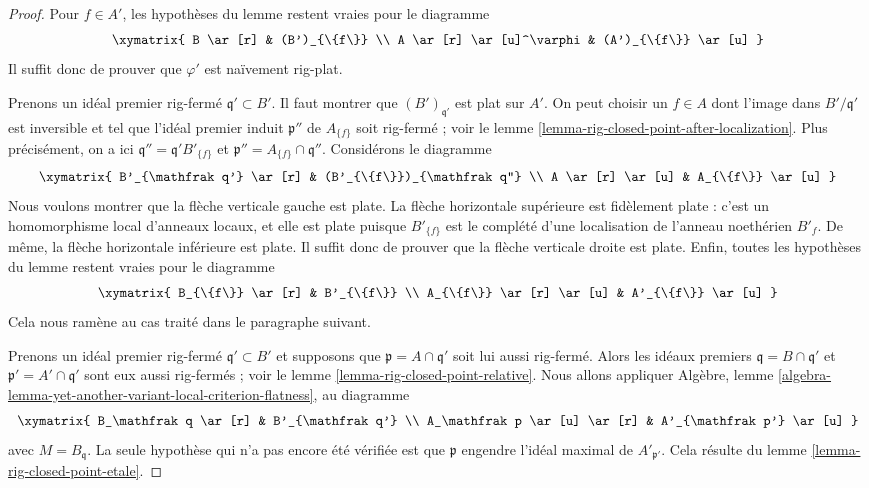 \begin{proof}
Pour $f \in A'$, les hypothèses du lemme restent vraies pour le diagramme
$$
\xymatrix{
B \ar[r] & (B')_{\{f\}} \\
A \ar[r] \ar[u]^\varphi & (A')_{\{f\}} \ar[u]
}
$$
Il suffit donc de prouver que $\varphi'$ est naïvement rig-plat.

\medskip\noindent
Prenons un idéal premier rig-fermé $\mathfrak q' \subset B'$.
Il faut montrer que $(B')_{\mathfrak q'}$ est plat sur $A'$.
On peut choisir un $f \in A$ dont l'image dans $B'/\mathfrak q'$ est inversible
et tel que l'idéal premier induit $\mathfrak p''$ de $A_{\{f\}}$ 
soit rig-fermé ; voir le lemme \ref{lemma-rig-closed-point-after-localization}.
Plus précisément, on a ici $\mathfrak q'' = \mathfrak q' B'_{\{f\}}$ et
$\mathfrak p'' = A_{\{f\}} \cap \mathfrak q''$.
Considérons le diagramme
$$
\xymatrix{
B'_{\mathfrak q'} \ar[r] &
(B'_{\{f\}})_{\mathfrak q''} \\
A \ar[r] \ar[u] &
A_{\{f\}} \ar[u]
}
$$
Nous voulons montrer que la flèche verticale gauche est plate.
La flèche horizontale supérieure est fidèlement plate : c'est un
homomorphisme local d'anneaux locaux, et elle est plate puisque $B'_{\{f\}}$
est le complété d'une localisation de l'anneau noethérien
$B'_f$. De même, la flèche horizontale inférieure est plate.
Il suffit donc de prouver que la flèche verticale droite est plate.
Enfin, toutes les hypothèses du lemme restent vraies pour le diagramme
$$
\xymatrix{
B_{\{f\}} \ar[r] &
B'_{\{f\}} \\
A_{\{f\}} \ar[r] \ar[u] &
A'_{\{f\}} \ar[u]
}
$$
Cela nous ramène au cas traité dans le paragraphe suivant.

\medskip\noindent
Prenons un idéal premier rig-fermé $\mathfrak q' \subset B'$
et supposons que $\mathfrak p = A \cap \mathfrak q'$ soit lui aussi rig-fermé.
Alors les idéaux premiers $\mathfrak q = B \cap \mathfrak q'$
et $\mathfrak p' = A' \cap \mathfrak q'$ sont eux aussi rig-fermés ; voir
le lemme \ref{lemma-rig-closed-point-relative}.
Nous allons appliquer
Algèbre, lemme \ref{algebra-lemma-yet-another-variant-local-criterion-flatness},
au diagramme
$$
\xymatrix{
B_\mathfrak q \ar[r] &
B'_{\mathfrak q'} \\
A_\mathfrak p \ar[u] \ar[r] &
A'_{\mathfrak p'} \ar[u]
}
$$
avec $M = B_\mathfrak q$. La seule hypothèse qui n'a pas encore été vérifiée
est que $\mathfrak p$ engendre l'idéal maximal de
$A'_{\mathfrak p'}$. Cela résulte du
lemme \ref{lemma-rig-closed-point-etale}.
\end{proof}

